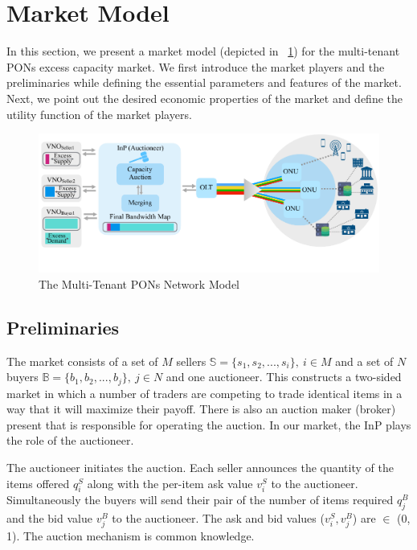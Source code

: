 \section{Market Model}
\label{sec:market-model}
In this section, we present a market model (depicted in \figureautorefname~\ref{Fig_model}) for the multi-tenant \acp{PON} excess capacity market. We first introduce the market players and the preliminaries while defining the essential parameters and features of the market. Next, we point out the desired economic properties of the market and define the utility function of the market players.

\begin{figure}[htbp]
  \centering
  \includegraphics[width=0.9\columnwidth]{Figures/pon.pdf}
\caption{The Multi-Tenant \acp{PON} Network Model}
\label{Fig_model}
\end{figure}

\subsection{Preliminaries}
The market consists of a set of $M$ sellers $\mathbb{S}=\{s_{1}, s_{2}, ...,s_{i}\}, \ i \in M$ and a set of $N$ buyers $\mathbb{B}=\{b_{1}, b_{2}, ...,b_{j}\}, \ j \in N$ and one auctioneer. This constructs a two-sided market in which a number of traders are competing to trade identical items in a way that it will maximize their payoff. There is also an auction maker (broker) present that is responsible for operating the auction. In our market, the \ac{InP} plays the role of the auctioneer.

The auctioneer initiates the auction. Each seller announces the quantity of the items offered $q^S_{i}$ along with the per-item ask value $v^S_{i}$ to the auctioneer. Simultaneously the buyers will send their pair of the number of items required $q^B_{j}$ and the bid value $v^B_{j}$ to the auctioneer. The ask and bid values ($v^S_{i}, v^B_{j}$) are $\in$ (0, 1). The auction mechanism is common knowledge.

